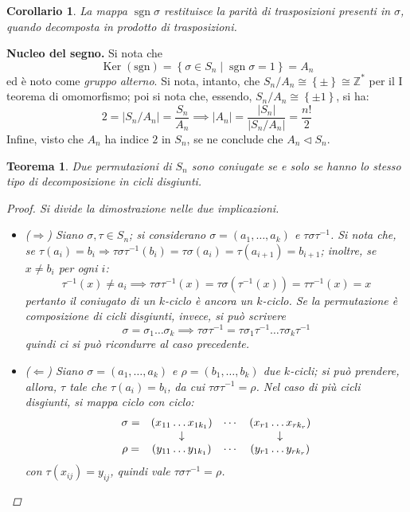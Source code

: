 \documentclass[12pt]{scrartcl}
\theoremstyle{style}
\newtheorem{teorema}{Teorema}[section]
\newtheorem{corollario}{Corollario}[teorema]
\numberwithin{equation}{subsection}
\begin{document}
\begin{corollario}
	La mappa $\operatorname{sgn} \sigma $ restituisce la parit\`a di trasposizioni presenti in $\sigma $, quando decomposta in prodotto di trasposizioni.
\end{corollario}

\textbf{Nucleo del segno.} 
Si nota che 
\begin{equation}
	\operatorname{Ker} (\mathrm{sgn}) = \left\{ \sigma \in S_n  \mid \operatorname{sgn} \sigma  = 1\right\} = A_n
\end{equation}
ed \`e noto come \textit{gruppo alterno}. 
Si nota, intanto, che $S_n / A_n \cong \left\{ \pm \right\} \cong \mathbb{Z}^*$ per il I teorema di omomorfismo; poi si nota che, essendo, $S_n / A_n\cong \left\{ \pm 1 \right\} $, si ha:
\[
2 = \lvert S_n / A_n \rvert = \frac{S_n}{A_n} \implies \lvert A_n \rvert = \frac{\lvert S_n \rvert }{\lvert S_n / A_n \rvert } = \frac{n!}{2}
\] 
Infine, visto che $A_n$ ha indice $2$ in $S_n$, se ne conclude che $A_ n \lhd S_n$.
\vspace{5pt}

\begin{teorema}
	Due permutazioni di $S_n$ sono coniugate se e solo se hanno lo stesso tipo di decomposizione in cicli disgiunti.
	\begin{proof}
		Si divide la dimostrazione nelle due implicazioni.
		\begin{itemize}
			\item ($\Rightarrow $) Siano $\sigma , \tau \in S_n$; si considerano $\sigma = (a_1, \ldots, a_k)$ e $\tau \sigma \tau ^{-1}$.
				Si nota che, se $\tau (a_i) = b_i\Rightarrow \tau \sigma \tau ^{-1}(b_i) = \tau \sigma (a_i) = \tau (a_{i+1} ) =b_{i+1} $; inoltre, se $x \neq b_i $ per ogni $i$:
				\[
				\tau ^{-1}(x) \neq a_i \implies \tau \sigma \tau ^{-1}(x) = \tau \sigma \left(\tau ^{-1}(x)\right) =\tau \tau ^{-1}(x) = x
				\] 
				pertanto il coniugato di un $k$-ciclo \`e ancora un $k$-ciclo.
				Se la permutazione \`e composizione di cicli disgiunti, invece, si pu\`o scrivere 
				\[
				\sigma = \sigma _1 \ldots\sigma _k \implies \tau \sigma \tau ^{-1}= \tau \sigma _1\tau ^{-1}\ldots \tau \sigma _k\tau ^{-1}
				\] 
				quindi ci si pu\`o ricondurre al caso precedente.
			\item ($\Leftarrow$) Siano $\sigma  = (a_1,\ldots,a_k)$ e $\rho =(b_1,\ldots,b_k)$ due $k$-cicli; si pu\`o prendere, allora, $\tau $ tale che $\tau (a_i) = b_i$, da cui $\tau \sigma \tau ^{-1}=\rho $. 
				Nel caso di pi\`u cicli disgiunti, si mappa ciclo con ciclo:
				\[
				\begin{array}
					{c c c c}
					\sigma = &(x_{11} \ldots x_{1k_1} )&\cdots & (x_{r1} \ldots x_{rk_r} )\\
						 &\downarrow &  & \downarrow\\
					\rho = &(y_{11} \ldots y_{1k_1} ) & \cdots & (y_{r1} \ldots y_{r k_r} )
				\end{array}
				\] 
				con $\tau (x_{ij} ) = y_{ij} $, quindi vale $\tau \sigma \tau ^{-1}=\rho $.
		\end{itemize}
	\end{proof}
\end{teorema}
\end{document}
